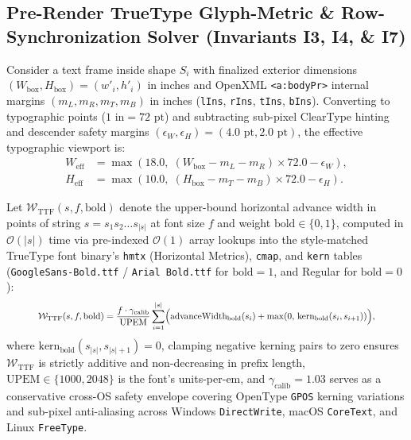 \documentclass[10pt,journal,compsoc]{IEEEtran}
\begin{document}
\subsection{Pre-Render TrueType Glyph-Metric \& Row-Synchronization Solver (Invariants I3, I4, \& I7)}
\label{sec:truetype}
Consider a text frame inside shape $S_i$ with finalized exterior dimensions $(W_{\text{box}}, H_{\text{box}}) = (w'_i, h'_i)$ in inches and OpenXML \texttt{<a:bodyPr>} internal margins $(m_L, m_R, m_T, m_B)$ in inches (\texttt{lIns}, \texttt{rIns}, \texttt{tIns}, \texttt{bIns}). Converting to typographic points ($1\text{ in} = 72\text{ pt}$) and subtracting sub-pixel ClearType hinting and descender safety margins $(\epsilon_W, \epsilon_H) = (4.0\text{ pt}, 2.0\text{ pt})$, the effective typographic viewport is:
\begin{align}
    W_{\text{eff}} &= \max\!\left(18.0,\; (W_{\text{box}} - m_L - m_R) \times 72.0 - \epsilon_W\right), \label{eq:weff}\\
    H_{\text{eff}} &= \max\!\left(10.0,\; (H_{\text{box}} - m_T - m_B) \times 72.0 - \epsilon_H\right). \label{eq:heff}
\end{align}

Let $\mathcal{W}_{\text{TTF}}(s, f, \text{bold})$ denote the upper-bound horizontal advance width in points of string $s = s_1 s_2 \dots s_{|s|}$ at font size $f$ and weight $\text{bold} \in \{0, 1\}$, computed in $\mathcal{O}(|s|)$ time via pre-indexed $\mathcal{O}(1)$ array lookups into the style-matched TrueType font binary's \texttt{hmtx} (Horizontal Metrics), \texttt{cmap}, and \texttt{kern} tables (\texttt{GoogleSans-Bold.ttf} / \texttt{Arial Bold.ttf} for $\text{bold}=1$, and Regular for $\text{bold}=0$):
\begin{equation}
\resizebox{0.88\columnwidth}{!}{$\displaystyle
    \mathcal{W}_{\text{TTF}}(s, f, \text{bold}) = \frac{f \cdot \gamma_{\text{calib}}}{\text{UPEM}} \sum_{i=1}^{|s|} \Bigl(\text{advanceWidth}_{\text{bold}}(s_i) + \max\!\left(0,\, \text{kern}_{\text{bold}}(s_i, s_{i+1})\right)\Bigr),
$}
\label{eq:wttf}
\end{equation}
where $\text{kern}_{\text{bold}}(s_{|s|}, s_{|s|+1}) = 0$, clamping negative kerning pairs to zero ensures $\mathcal{W}_{\text{TTF}}$ is strictly additive and non-decreasing in prefix length, $\text{UPEM} \in \{1000, 2048\}$ is the font's units-per-em, and $\gamma_{\text{calib}} = 1.03$ serves as a conservative cross-OS safety envelope covering OpenType \texttt{GPOS} kerning variations and sub-pixel anti-aliasing across Windows \texttt{DirectWrite}, macOS \texttt{CoreText}, and Linux \texttt{FreeType}.
\end{document}
